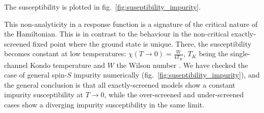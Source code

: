 \documentclass[reprint,prb,superscriptaddress]{revtex4-1}
\begin{document}
The susceptibility is plotted in fig.~\ref{fig:suseptibility_impurity}.

This non-analyticity in a response function is a signature of the critical nature of the Hamiltonian. This is in contrast to the behaviour in the non-critical exactly-screened fixed point where the ground state is unique. There, the susceptibility becomes constant at low temperatures: \(\chi(T\to 0) = \frac{W}{4 T_K}\), \(T_K\) being the single-channel Kondo temperature and \(W\) the Wilson number \cite{wilson1975renormalization,nozieres1974fermi,bullaNRGreview,kondo_urg}. We have checked the case of general spin-\(S\) impurity numerically (fig.~\ref{fig:suseptibility_impurity}), and the general conclusion is that all exactly-screened models show a constant impurity susceptibility at \(T \to 0\), while the over-screened and under-screened cases show a diverging impurity susceptibility in the same limit. 
\end{document}
